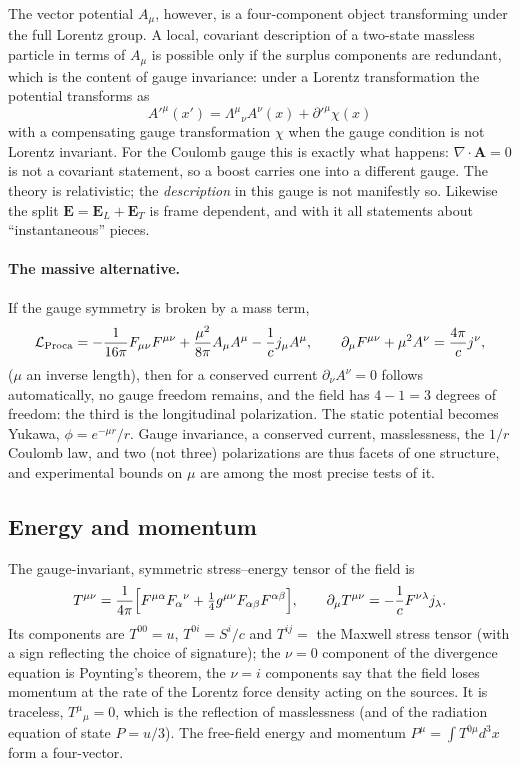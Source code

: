 \documentclass[11pt,a4paper]{book}
\begin{document}
The vector potential $A_\mu$, however, is a four-component object transforming under the full Lorentz
group. A local, covariant description of a two-state massless particle in terms of $A_\mu$ is possible only
if the surplus components are redundant, which is the content of gauge invariance:
under a Lorentz transformation the potential transforms as
\begin{equation}
A'^\mu(x')=\Lambda^\mu{}_\nu A^\nu(x)+\partial'^\mu\chi(x)
\end{equation}
with a compensating gauge transformation $\chi$ when the gauge condition is not Lorentz invariant.
For the Coulomb gauge this is exactly what happens: $\nabla\cdot\mathbf A=0$ is not a covariant
statement, so a boost carries one into a different gauge. The theory is relativistic; the
\emph{description} in this gauge is not manifestly so. Likewise the split $\mathbf E=\mathbf E_L+\mathbf E_T$
is frame dependent, and with it all statements about ``instantaneous'' pieces.

\paragraph{The massive alternative.} If the gauge symmetry is broken by a mass term,
\begin{equation}
\mathcal L_{\rm Proca}=-\frac1{16\pi}F_{\mu\nu}F^{\mu\nu}+\frac{\mu^2}{8\pi}A_\mu A^\mu-\frac1cj_\mu A^\mu,
\qquad
\partial_\mu F^{\mu\nu}+\mu^2A^\nu=\frac{4\pi}cj^\nu ,
\end{equation}
($\mu$ an inverse length), then for a conserved current $\partial_\nu A^\nu=0$ follows automatically,
no gauge freedom remains, and the field has $4-1=3$ degrees of freedom: the third is the longitudinal
polarization. The static potential becomes Yukawa, $\phi=e^{-\mu r}/r$. Gauge invariance, a conserved
current, masslessness, the $1/r$ Coulomb law, and two (not three) polarizations are
thus facets of one structure, and experimental bounds on $\mu$ are among the most precise tests of it.

\subsection{Energy and momentum}

The gauge-invariant, symmetric stress--energy tensor of the field is
\begin{equation}
T^{\mu\nu}=\frac1{4\pi}\Bigl[F^{\mu\alpha}F_\alpha{}^{\nu}+\tfrac14g^{\mu\nu}F_{\alpha\beta}F^{\alpha\beta}\Bigr],
\qquad
\partial_\mu T^{\mu\nu}=-\frac1c F^{\nu\lambda}j_\lambda .
\end{equation}
Its components are $T^{00}=u$, $T^{0i}=S^i/c$ and $T^{ij}=$ the Maxwell stress tensor (with a sign
reflecting the choice of signature); the $\nu=0$ component of the divergence equation is Poynting's theorem,
the $\nu=i$ components say that the field loses momentum at the rate of the Lorentz force density
acting on the sources. It is traceless, $T^\mu{}_\mu=0$, which is
the reflection of masslessness (and of the radiation equation of state $P=u/3$). The
free-field energy and momentum $P^\mu=\int T^{0\mu}d^3x$ form a four-vector.
\end{document}
